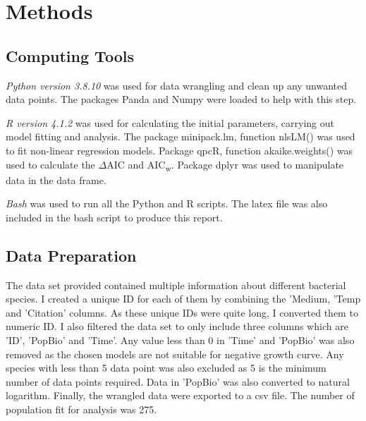 \documentclass[11pt]{article}
\begin{document}
\newpage
\section{Methods}
\subsection{Computing Tools}
\emph{Python version 3.8.10} was used for data wrangling and clean up any unwanted data points. The packages Panda and Numpy were loaded to help with this step. 

\emph{R version 4.1.2} was used for calculating the initial parameters, carrying out model fitting and analysis. The package minipack.lm, function nlsLM() was used to fit non-linear regression models. Package qpcR, function akaike.weights() was used to calculate the $\Delta$AIC and {AIC\textsubscript{w}}. Package dplyr was used to manipulate data in the data frame. 

\emph{Bash} was used to run all the Python and R scripts. The latex file was also included in the bash script to produce this report.  

\subsection{Data Preparation}
The data set provided contained multiple information about different bacterial species. I created a unique ID for each of them by combining the 'Medium, 'Temp and 'Citation' columns. As these unique IDs were quite long, I converted them to numeric ID. I also filtered the data set to only include three columns which are 'ID', 'PopBio' and 'Time'. Any value less than 0 in 'Time' and 'PopBio' was also removed as the chosen models are not suitable for negative growth curve. Any species with less than 5 data point was also excluded as 5 is the minimum number of data points required. Data in 'PopBio' was also converted to natural logarithm.  Finally, the wrangled data were exported to a csv file. The number of population fit for analysis was 275.
\end{document}
